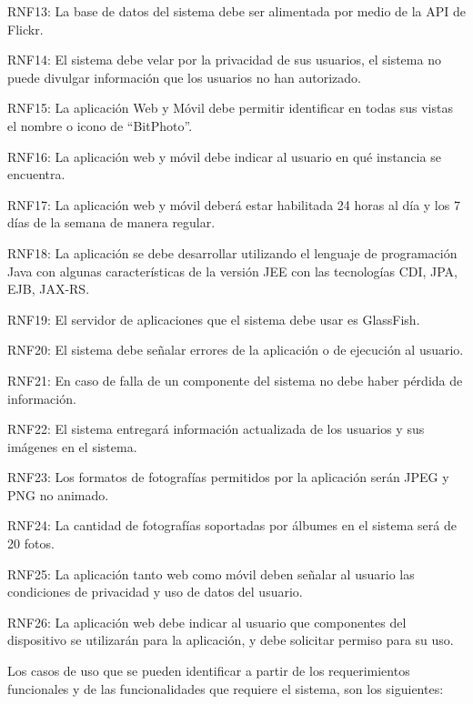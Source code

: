 \documentclass{memoria}
\begin{document}
RNF13: La base de datos del sistema debe ser alimentada por medio de la API de Flickr.

RNF14: El sistema debe velar por la privacidad de sus usuarios, el sistema no puede divulgar información que los usuarios no han autorizado.

RNF15: La aplicación Web y Móvil debe permitir identificar en todas sus vistas el nombre o icono de “BitPhoto”.

RNF16: La aplicación web y móvil debe indicar al usuario en qué instancia se encuentra.

RNF17: La aplicación web y móvil deberá estar habilitada 24 horas al día y los 7 días de la semana de manera regular.

RNF18: La aplicación se debe desarrollar utilizando el lenguaje de programación Java con algunas características de la versión JEE con las tecnologías CDI, JPA, EJB, JAX-RS.

RNF19: El servidor de aplicaciones que el sistema debe usar es GlassFish.

RNF20: El sistema debe señalar errores de la aplicación o de ejecución al usuario.

RNF21: En caso de falla de un componente del sistema no debe haber pérdida de información.

RNF22: El sistema entregará información actualizada de los usuarios y sus imágenes en  el sistema.

RNF23: Los formatos de fotografías permitidos por la aplicación serán JPEG y PNG no animado.

RNF24: La cantidad de fotografías soportadas por álbumes en el sistema será de 20 fotos.

RNF25: La aplicación tanto web como móvil deben señalar al usuario las condiciones de privacidad y uso de datos del usuario.

RNF26: La aplicación web debe indicar al usuario que componentes del dispositivo se utilizarán para la aplicación, y debe solicitar permiso para su uso.



Los casos de uso que se pueden identificar a partir de los requerimientos funcionales y de las funcionalidades que requiere el sistema, son los siguientes:
\end{document}
